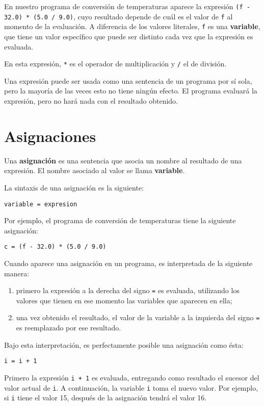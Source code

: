 En nuestro programa de conversión de temperaturas aparece la expresión
\lstinline!(f - 32.0) * (5.0 / 9.0)!, cuyo resultado depende de cuál es
el valor de \lstinline!f! al momento de la evaluación. A diferencia de
los valores literales, \lstinline!f! es una \textbf{variable}, que tiene
un valor específico que puede ser distinto cada vez que la expresión es
evaluada.

En esta expresión, \lstinline!*! es el operador de multiplicación y
\lstinline!/! el de división.

Una expresión puede ser usada como una sentencia de un programa por sí
sola, pero la mayoría de las veces esto no tiene ningún efecto. El
programa evaluará la expresión, pero no hará nada con el resultado
obtenido.

\section{Asignaciones}

Una \textbf{asignación} es una sentencia que asocia un nombre al
resultado de una expresión. El nombre asociado al valor se llama
\textbf{variable}.

La sintaxis de una asignación es la siguiente:

\begin{lstlisting}
variable = expresion
\end{lstlisting}

Por ejemplo, el programa de conversión de temperaturas tiene la
siguiente asignación:

\begin{lstlisting}
c = (f - 32.0) * (5.0 / 9.0)
\end{lstlisting}

Cuando aparece una asignación en un programa, es interpretada de la
siguiente manera:

\begin{enumerate}
\item
  primero la expresión a la derecha del signo \lstinline!=! es evaluada,
  utilizando los valores que tienen en ese momento las variables que
  aparecen en ella;
\item
  una vez obtenido el resultado, el valor de la variable a la izquierda
  del signo \lstinline!=! es reemplazado por ese resultado.
\end{enumerate}

Bajo esta interpretación, es perfectamente posible una asignación como
ésta:
\begin{lstlisting}
i = i + 1
\end{lstlisting}
Primero la expresión \lstinline!i + 1! es evaluada, entregando como
resultado el sucesor del valor actual de \lstinline!i!. A continuación,
la variable \lstinline!i! toma el nuevo valor. Por ejemplo, si
\lstinline!i! tiene el valor 15, después de la asignación tendrá el
valor 16.

